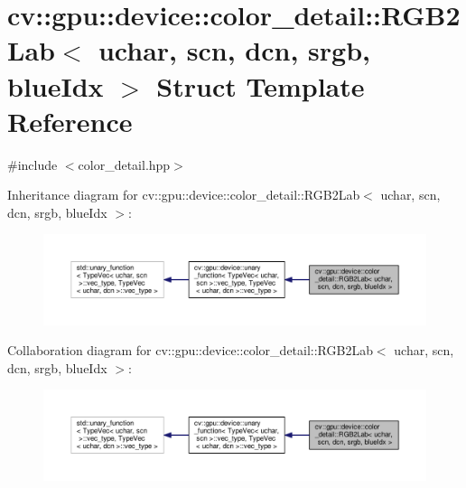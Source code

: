 \hypertarget{structcv_1_1gpu_1_1device_1_1color__detail_1_1RGB2Lab_3_01uchar_00_01scn_00_01dcn_00_01srgb_00_01blueIdx_01_4}{\section{cv\-:\-:gpu\-:\-:device\-:\-:color\-\_\-detail\-:\-:R\-G\-B2\-Lab$<$ uchar, scn, dcn, srgb, blue\-Idx $>$ Struct Template Reference}
\label{structcv_1_1gpu_1_1device_1_1color__detail_1_1RGB2Lab_3_01uchar_00_01scn_00_01dcn_00_01srgb_00_01blueIdx_01_4}
}


{\ttfamily \#include $<$color\-\_\-detail.\-hpp$>$}



Inheritance diagram for cv\-:\-:gpu\-:\-:device\-:\-:color\-\_\-detail\-:\-:R\-G\-B2\-Lab$<$ uchar, scn, dcn, srgb, blue\-Idx $>$\-:\nopagebreak
\begin{figure}[H]
\begin{center}
\leavevmode
\includegraphics[width=350pt]{structcv_1_1gpu_1_1device_1_1color__detail_1_1RGB2Lab_3_01uchar_00_01scn_00_01dcn_00_01srgb_00_01blueIdx_01_4__inherit__graph}
\end{center}
\end{figure}


Collaboration diagram for cv\-:\-:gpu\-:\-:device\-:\-:color\-\_\-detail\-:\-:R\-G\-B2\-Lab$<$ uchar, scn, dcn, srgb, blue\-Idx $>$\-:\nopagebreak
\begin{figure}[H]
\begin{center}
\leavevmode
\includegraphics[width=350pt]{structcv_1_1gpu_1_1device_1_1color__detail_1_1RGB2Lab_3_01uchar_00_01scn_00_01dcn_00_01srgb_00_01blueIdx_01_4__coll__graph}
\end{center}
\end{figure}
